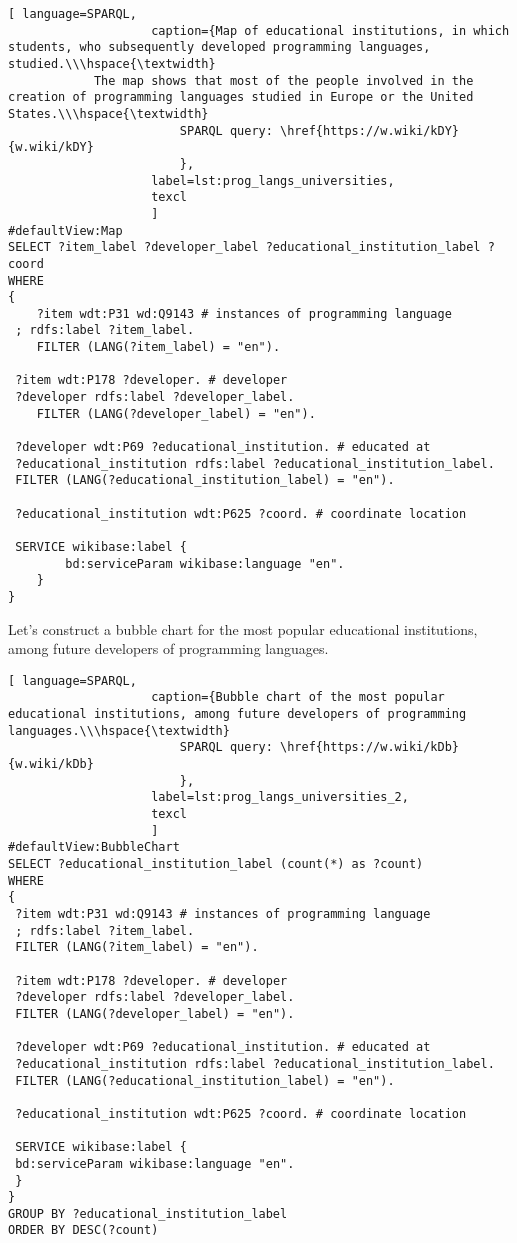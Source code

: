 \begin{lstlisting}[ language=SPARQL, 
                    caption={Map of educational institutions, in which students, who subsequently developed programming languages, studied.\\\hspace{\textwidth}
			The map shows that most of the people involved in the creation of programming languages studied in Europe or the United States.\\\hspace{\textwidth}
                        SPARQL query: \href{https://w.wiki/kDY}{w.wiki/kDY}
                        },
                    label=lst:prog_langs_universities,
                    texcl 
                    ]
#defaultView:Map
SELECT ?item_label ?developer_label ?educational_institution_label ?coord
WHERE
{
 	?item wdt:P31 wd:Q9143 # instances of programming language
 ; rdfs:label ?item_label. 
 	FILTER (LANG(?item_label) = "en"). 
 
 ?item wdt:P178 ?developer. # developer
 ?developer rdfs:label ?developer_label. 
 	FILTER (LANG(?developer_label) = "en"). 
 		
 ?developer wdt:P69 ?educational_institution. # educated at
 ?educational_institution rdfs:label ?educational_institution_label. 
 FILTER (LANG(?educational_institution_label) = "en").
 
 ?educational_institution wdt:P625 ?coord. # coordinate location

 SERVICE wikibase:label {
		bd:serviceParam wikibase:language "en".
	} 	
}
\end{lstlisting}%

Let's construct a bubble chart for the most popular educational institutions, among future developers of programming languages. 

\begin{lstlisting}[ language=SPARQL, 
                    caption={Bubble chart of the most popular educational institutions, among future developers of programming languages.\\\hspace{\textwidth}
                        SPARQL query: \href{https://w.wiki/kDb}{w.wiki/kDb}
                        },
                    label=lst:prog_langs_universities_2,
                    texcl 
                    ]
#defaultView:BubbleChart
SELECT ?educational_institution_label (count(*) as ?count)
WHERE
{
 ?item wdt:P31 wd:Q9143 # instances of programming language
 ; rdfs:label ?item_label. 
 FILTER (LANG(?item_label) = "en"). 
 
 ?item wdt:P178 ?developer. # developer
 ?developer rdfs:label ?developer_label. 
 FILTER (LANG(?developer_label) = "en"). 
 	
 ?developer wdt:P69 ?educational_institution. # educated at
 ?educational_institution rdfs:label ?educational_institution_label. 
 FILTER (LANG(?educational_institution_label) = "en").
 
 ?educational_institution wdt:P625 ?coord. # coordinate location
 
 SERVICE wikibase:label {
 bd:serviceParam wikibase:language "en".
 } 	
}
GROUP BY ?educational_institution_label
ORDER BY DESC(?count)
\end{lstlisting}%

